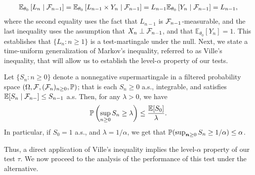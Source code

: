 \documentclass[12pt]{article}
\begin{document}
\begin{align}
    \mathbb{E}_{\theta_0}\left[ L_n \mid {\cal F}_{n-1} \right] = \mathbb{E}_{\theta_0}\left[ L_{n-1} \times  Y_n \mid {\cal F}_{n-1} \right] = L_{n-1} \mathbb{E}_{\theta_0}\left[ Y_n \mid {\cal F}_{n-1} \right] = L_{n-1}, 
\end{align}
where the second equality uses the fact that $L_{n-1}$ is ${\cal F}_{n-1}$-measurable, and the last inequality uses the assumption that $X_n \perp {\cal F}_{n-1}$, and that $\mathbb{E}_{\theta_0}[Y_n] = 1$.
This establishes that $\{L_n: n \geq 1\}$ is  a test-martingale under the null. Next, we state a time-uniform generalization of Markov's inequality, referred to as Ville's inequality, that will allow us to establish the level-$\alpha$ property of our tests. 
\begin{fact}
    \label{fact:Villes-Inequality} Let $\{S_n: n \geq 0\}$ denote a nonnegative supermartingale in a filtered probability space $(\Omega, {\cal F}, ({\cal F}_n)_{n \geq 0}, \mathbb{P})$; that is each $S_n \geq 0$ a.s., integrable, and satisfies $\mathbb{E}[S_n \mid {\cal F}_{n-}] \leq S_{n-1}$ a.s. Then, for any $\lambda > 0$, we have 
    \begin{align}
        \mathbb{P}\left( \sup_{n \geq 0} S_n \geq \lambda \right) \leq \frac{\mathbb{E}[S_0]}{\lambda}. 
    \end{align}
    In particular, if $S_0=1$ a.s., and $\lambda = 1/\alpha$, we get that $\mathbb{P}(\sup_{ {\boldsymbol n} \geq 0} S_n \geq 1/\alpha) \leq \alpha$. 
\end{fact}
Thus, a direct application of Ville's inequality implies the level-$\alpha$ property of our test $\tau$. We now proceed to the analysis of the performance of this test under the alternative. 
\end{document}
